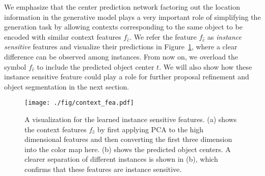 \documentclass[10pt,twocolumn,letterpaper]{article}
\begin{document}
We emphasize that the center prediction network factoring out the location information in the generative model plays a very important role of simplifying the generation task by allowing contexts corresponding to the same object to be encoded with similar context features $f_{\hat{c}}$.
We refer the feature $f_{\hat{c}}$ as \emph{instance sensitive} features and visualize their predictions in Figure~\ref{fig:context_fea}, where a clear difference can be observed among instances. From now on, we overload the symbol $f_{\hat{c}}$ to include the predicted object center $t$. We will also show how these instance sensitive feature could play a role for further proposal refinement and object segmentation in the next section.

\begin{figure}
    \centering
    \texttt{[image: ./fig/context\_fea.pdf]}
    \caption{A visualization for the learned instance sensitive features. (a) shows the context features $f_{\hat{c}}$ by first applying PCA to the high dimensional features and then converting the first three dimension into the color map here. (b) shows the predicted object centers. A clearer separation of different instances is shown in (b), which confirms that these features are instance sensitive.}
    \label{fig:context_fea}
    \vspace{-\baselineskip}
\end{figure}

\vspace{-\baselineskip}
\end{document}
